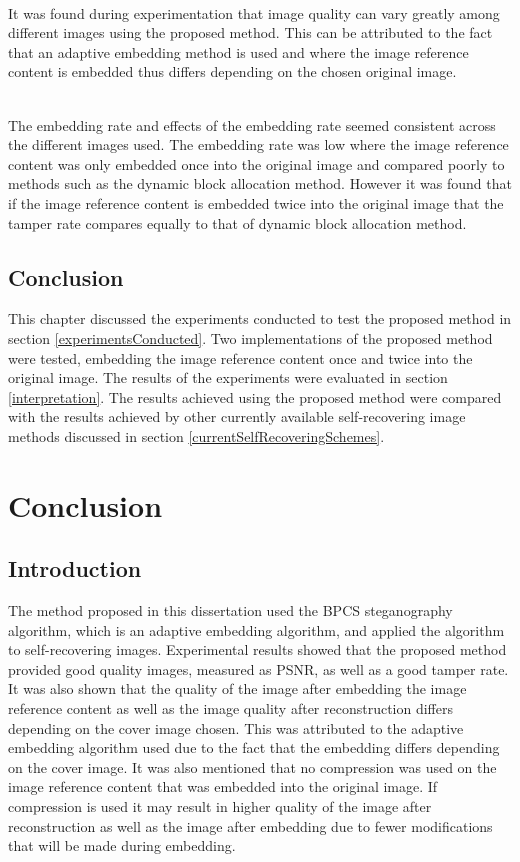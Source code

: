 \documentclass[12pt]{article}
\begin{document}
\hspace{0pt} \\
It was found during experimentation that image quality can vary greatly among different images using the proposed method.
This can be attributed to the fact that an adaptive embedding method is used and where the image reference content is embedded thus differs depending on the chosen original image.

\hspace{0pt} \\
The embedding rate and effects of the embedding rate seemed consistent across the different images used.
The embedding rate was low where the image reference content was only embedded once into the original image and compared poorly to methods such as the dynamic block allocation method.
However it was found that if the image reference content is embedded twice into the original image that the tamper rate compares equally to that of dynamic block allocation method.

\subsection{Conclusion}
This chapter discussed the experiments conducted to test the proposed method in section \ref{experimentsConducted}.
Two implementations of the proposed method were tested, embedding the image reference content once and twice into the original image.
The results of the experiments were evaluated in section \ref{interpretation}.
The results achieved using the proposed method were compared with the results achieved by other currently available self-recovering image methods discussed in section \ref{currentSelfRecoveringSchemes}.  

\section{Conclusion}
\subsection{Introduction}
The method proposed in this dissertation used the BPCS steganography algorithm, which is an adaptive embedding algorithm, and applied the algorithm to self-recovering images.
Experimental results showed that the proposed method provided good quality images, measured as PSNR, as well as a good tamper rate.
It was also shown that the quality of the image after embedding the image reference content as well as the image quality after reconstruction differs depending on the cover image chosen.
This was attributed to the adaptive embedding algorithm used due to the fact that the embedding differs depending on the cover image.
It was also mentioned that no compression was used on the image reference content that was embedded into the original image.
If compression is used it may result in higher quality of the image after reconstruction as well as the image after embedding due to fewer modifications that will be made during embedding.
\end{document}
